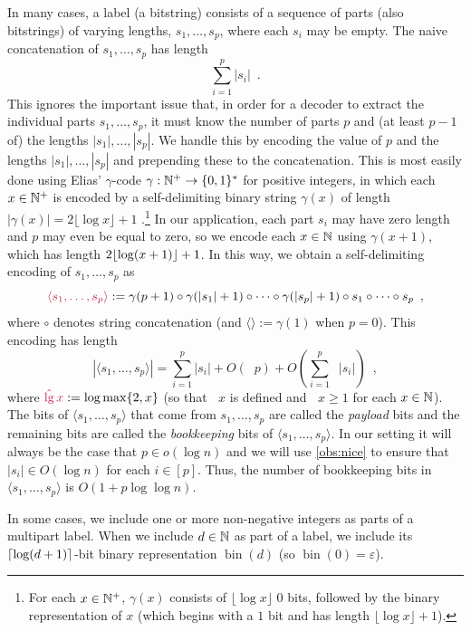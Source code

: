 \documentclass{patmorin}
\makeatletter
\renewcommand{\ge}{\geqslant}
\newcommand{\defin}[1]{\emph{\textcolor{brightmaroon}{#1}}}
\def\mathcolor#1#{\@mathcolor{#1}}
\def\@mathcolor#1#2#3{%
  \protect\leavevmode
  \begingroup
    \color#1{#2}#3%
  \endgroup
}
\newcommand{\mathdefin}[1]{\mathcolor{brightmaroon}{#1}}
\DeclareMathOperator{\lgg}{\hat{lg}}
\DeclareMathOperator{\bin}{bin}
\newcommand{\Oh}{O}
\DeclarePairedDelimiter{\ceil}{\lceil}{\rceil}
\makeatother
\begin{document}
In many cases, a label (a bitstring) consists of a sequence of parts (also bitstrings) of varying lengths, $s_1,\ldots,s_p$, where each $s_i$ may be empty.  The naive concatenation of $s_1,\ldots,s_p$ has length
\[
  \textstyle \sum_{i=1}^p|s_i| \enspace .
\]
This ignores the important issue that, in order for a decoder to extract the individual parts $s_1,\ldots,s_p$, it must know the number of parts $p$ and (at least $p-1$ of) the lengths $|s_1|,\ldots,|s_p|$.  We handle this by encoding the value of $p$ and the lengths $|s_1|,\ldots,|s_p|$ and prepending these to the concatenation. This is most easily done using Elias' $\gamma$-code $\gamma:\mathbb{N}^+\to\{0,1\}^*$ for positive integers, in which each $x\in\mathbb{N}^+$ is encoded by a self-delimiting binary string $\gamma(x)$ of length $|\gamma(x)|= 2\lfloor \log x  \rfloor  + 1$ \cite{elias:universal}.\footnote{For each $x\in\mathbb{N}^+$, $\gamma(x)$ consists of $\lfloor\log x\rfloor$ 0 bits, followed by the binary representation of $x$ (which begins with a $1$ bit and has length $\lfloor\log x\rfloor+1$).} In our application, each part $s_i$ may have zero length and $p$ may even be equal to zero, so we encode each $x\in\mathbb{N}$ using $\gamma(x+1)$, which has length $2{\lfloor \log (x+1) \rfloor}+1$.
In this way, we obtain a self-delimiting encoding of $s_1,\ldots,s_p$ as
\[  \mathdefin{\langle s_1,\ldots,s_p\rangle}:=\gamma(p+1)\circ\gamma(|s_1|+1)\circ\cdots\circ\gamma(|s_p|+1)\circ s_1\circ\cdots\circ s_p \enspace ,
\]
where $\circ$ denotes string concatenation (and $\langle\rangle:=\gamma(1)$ when $p=0$). This encoding has length
\begin{equation}
  |\langle s_1,\ldots,s_p\rangle| = \textstyle\sum_{i=1}^p|s_i|+\Oh(\lgg p) + \Oh(\sum_{i=1}^p\lgg|s_i|) \enspace , \label{encoding_cost}
\end{equation}
where $\mathdefin{\lgg x} := \log\max\{2,x\}$ (so that $\lgg x$ is defined and $\lgg x\ge 1$ for each $x\in\mathbb{N}$).  The bits of $\langle s_1,\ldots,s_p\rangle$ that come from $s_1,\ldots,s_p$ are called the \defin{payload} bits and the remaining bits are called the \defin{bookkeeping} bits of $\langle s_1,\ldots,s_p\rangle$.
In our setting it will always be the case that $p\in o(\log n)$ and we will use \cref{obs:nice} to ensure that $|s_i|\in \Oh(\log n)$ for each $i\in[p]$.
Thus, the number of bookkeeping bits in $\langle s_1,\ldots,s_p\rangle$ is $\Oh(1 + p\log\log n)$.

In some cases, we include one or more non-negative integers as parts of a multipart label.  When we include $d\in\mathbb{N}$ as part of a label, we include its $\ceil{\log(d+1)}$-bit binary representation \defin{$\bin(d)$} (so $\bin(0)=\varepsilon$).
\end{document}
